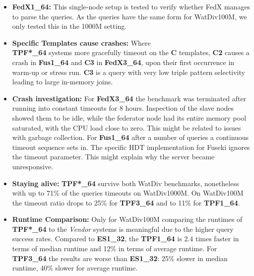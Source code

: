 \documentclass[twocolumn]{bmcart}%
\begin{document}
\begin{itemize}
	\item \textbf{FedX1\_64:} This single-node setup is tested to verify whether FedX manages to parse the queries. As the queries have the same form for WatDiv100M, we only tested this in the 1000M setting.
	\item \textbf{Specific Templates cause crashes:} Where \\ \textbf{TPF*\_64} systems more gracefully timeout on the \textbf{C} templates, \textbf{C2} causes a crash in \textbf{Fus1\_64} and \textbf{C3} in \textbf{FedX3\_64}, upon their first occurrence in warm-up or stress run. \textbf{C3} is a query with very low triple pattern selectivity leading to large in-memory joins.
	\item \textbf{Crash investigation:} For \textbf{FedX3\_64} the benchmark was terminated after running into constant timeouts for 8 hours. Inspection of the slave nodes showed them to be idle, while the federator node had its entire memory pool saturated, with the CPU load close to zero. This might be related to issues with garbage collection.
	For \textbf{Fus1\_64} after a number of queries a continuous timeout sequence sets in. The specific HDT implementation for Fuseki ignores the timeout parameter. This might explain why the server became unresponsive.
	\item \textbf{Staying alive:} \textbf{TPF*\_64} survive both WatDiv benchmarks, nonetheless with up to 71\% of the queries timeouts on WatDiv1000M. On WatDiv100M the timeout ratio drops to 25\% for \textbf{TPF3\_64} and to 11\% for \textbf{TPF1\_64}.
	\item \textbf{Runtime Comparison: } Only for WatDiv100M comparing the runtimes of \textbf{TPF*\_64} to the \emph{Vendor} systems is meaningful due to the higher query success rates. Compared to \textbf{ES1\_32}, the \textbf{TPF1\_64} is 2.4 times faster in terms of median runtime and 12\% in terms of average runtime. For \textbf{TPF3\_64} the results are worse than \textbf{ES1\_32}: 25\% slower in median runtime, 40\% slower for average runtime.
\end{itemize}
\end{document}
